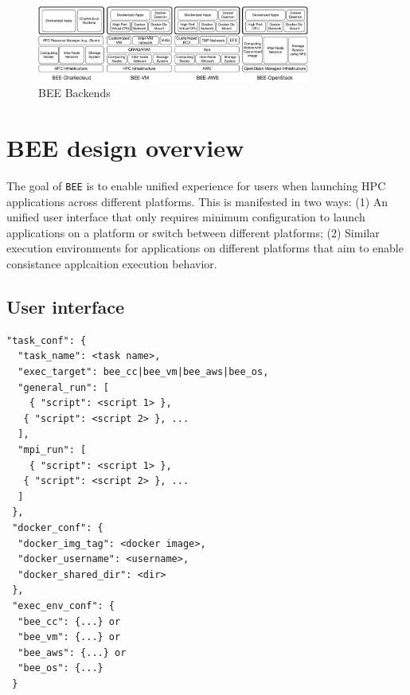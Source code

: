 \begin{figure}
    \centering
    \includegraphics[width=0.8\textwidth]{figures/bee-framework-detail.pdf}
    \caption{BEE Backends}
    \label{bee-backend}
\end{figure}


\section{BEE design overview}
\label{bee-framework-section}
The goal of \texttt{BEE} is to enable unified experience for users when launching HPC applications across different platforms. This is manifested in two ways: (1) An unified user interface that only requires minimum configuration to launch applications on a platform or switch between different platforms; (2) Similar execution environments for applications on different platforms that aim to enable consistance applcaition execution behavior.

\subsection{User interface}

\lstset{numbers=left,
xleftmargin=1.5em,
frame=single,
framexleftmargin=2em}


\lstset{language=Java}
\begin{lstlisting}[float, escapechar=!,
				   caption= Template of \texttt{beefile}]
 "task_conf": {
  "task_name": <task name>,
  "exec_target": bee_cc|bee_vm|bee_aws|bee_os,
  "general_run": [
  	{ "script": <script 1> },
   { "script": <script 2> }, ...
  ],
  "mpi_run": [
  	{ "script": <script 1> },
   { "script": <script 2> }, ...
  ]
 },
 "docker_conf": {
  "docker_img_tag": <docker image>,
  "docker_username": <username>,
  "docker_shared_dir": <dir>
 },
 "exec_env_conf": {
  "bee_cc": {...} or
  "bee_vm": {...} or
  "bee_aws": {...} or
  "bee_os": {...} 
 }       

\end{lstlisting}

